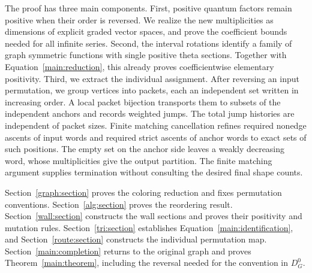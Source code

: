 The proof has three main components.  First, positive quantum factors
remain positive when their order is reversed.  We realize the new
multiplicities as dimensions of explicit graded vector spaces, and
prove the coefficient bounds needed for all infinite series.
Second, the interval rotations identify a family of graph symmetric
functions with single positive theta sections. Together with
Equation~\eqref{main:reduction}, this already proves coefficientwise
elementary positivity. Third, we extract the individual assignment.
After reversing an input permutation, we group vertices into packets,
each an independent set written in increasing order. A local packet
bijection transports them to subsets of the independent anchors and
records weighted jumps. The total jump histories are independent of
packet sizes. Finite matching cancellation refines required nonedge
ascents of input words and required strict ascents of anchor words to
exact sets of such positions. The empty set on the anchor side leaves
a weakly decreasing word, whose multiplicities give the output partition. The finite
matching argument supplies termination without consulting the desired
final shape counts.

Section~\ref{graph:section} proves the coloring reduction and fixes
permutation conventions. Section~\ref{alg:section} proves the
reordering result. Section~\ref{wall:section} constructs the wall
sections and proves their positivity and mutation rules.
Section~\ref{tri:section} establishes
Equation~\eqref{main:identification}, and
Section~\ref{route:section} constructs the individual permutation map.
Section~\ref{main:completion} returns to the original graph and proves
Theorem~\ref{main:theorem}, including the reversal needed for the
convention in $D_G^0$.
